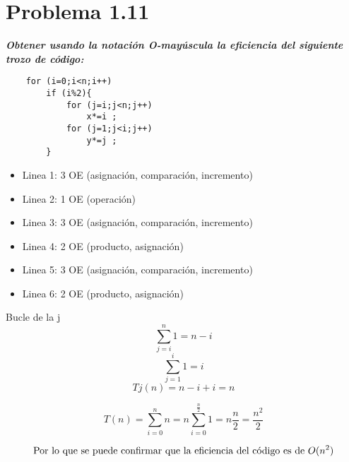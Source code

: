 \section{Problema 1.11}
\textbf{\textit{Obtener usando la notación O-mayúscula la eficiencia del siguiente trozo de código:}}
\begin {lstlisting}						
	for (i=0;i<n;i++)
		if (i%
			for (j=i;j<n;j++)
				x*=i ;
			for (j=1;j<i;j++)
				y*=j ;
		}
\end{lstlisting}

\begin{itemize}
	\item Linea 1: 3 OE (asignación, comparación, incremento) 
	\item Linea 2: 1 OE (operación)
	\item Linea 3: 3 OE (asignación, comparación, incremento)
	\item Linea 4: 2 OE (producto, asignación)
	\item Linea 5: 3 OE (asignación, comparación, incremento)
	\item Linea 6: 2 OE (producto, asignación)
\end{itemize}

Bucle de la j
\begin{equation}
\sum_{j=i}^{n}1 = n-i 
\end{equation}
\begin{equation}
\sum_{j=1}^{i}1 = i 
\end{equation}
\begin{equation}
Tj (n) = n - i + i = n  
\end{equation}

\begin{equation}
T(n)=\sum_{i=0}^{n}n = n\sum_{i=0}^{\frac{n}{2}}1 = n \frac{n}{2} = \frac{n^2}{2}
\end{equation}

\begin{equation}
\textup{Por lo que se puede confirmar que la eficiencia del código es de } O(n^2)
\end{equation}

\newpage

